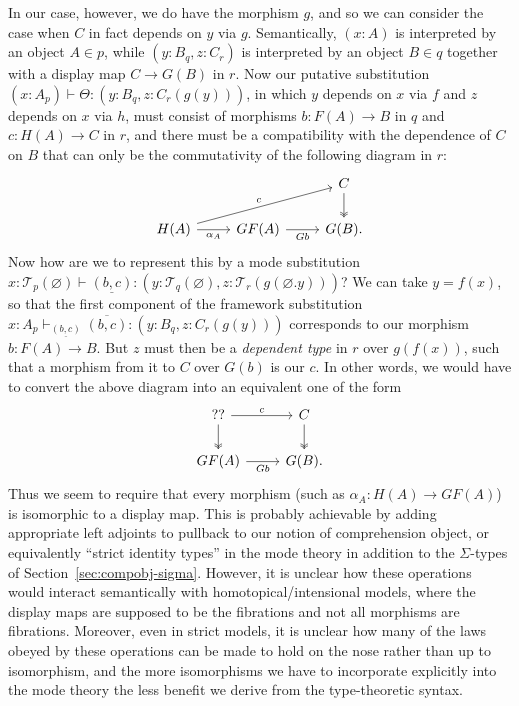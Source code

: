 \documentclass[10pt]{article}
\theoremstyle{definition}
\let\emptyset\varnothing
\newcommand{\yields}{\vdash}
\newcommand\El[2]{\mathcal{T}_{#1}(#2)}
\newcommand{\upstairs}[1]{\overline{#1}}
\newcommand{\downstairs}[1]{\underline{#1}}
\begin{document}
In our case, however, we do have the morphism $g$, and so we can consider the case when $C$ in fact depends on $y$ via $g$.
Semantically, $(x:A)$ is interpreted by an object $A\in p$, while $(y:B_q,z:C_r)$ is interpreted by an object $B\in q$ together with a display map $C \to G(B)$ in $r$.
Now our putative substitution $(x:A_p) \yields \Theta : (y:B_q, z:C_r(g(y)))$, in which $y$ depends on $x$ via $f$ and $z$ depends on $x$ via $h$, must consist of morphisms $b:F(A) \to B$ in $q$ and $c:H(A) \to C$ in $r$, and there must be a compatibility with the dependence of $C$ on $B$ that can only be the commutativity of the following diagram in $r$:
\[
  \begin{tikzcd}
    && C \ar[d,two heads] \\
    H(A) \ar[urr,"c"] \ar[r,"\alpha_A"'] & GF(A) \ar[r,"Gb"'] & G(B).
  \end{tikzcd}
\]
Now how are we to represent this by a mode substitution $x:\El{p}{\emptyset} \yields \downstairs{(b,c)} : (y:\El{q}{\emptyset},z:\El{r}{g(\emptyset.y)})$?
We can take $y = f(x)$, so that the first component of the framework substitution $x:A_p \yields_{\downstairs{(b,c)}} \upstairs{(b,c)} : (y:B_q, z:C_r(g(y)))$ corresponds to our morphism $b:F(A) \to B$.
But $z$ must then be a \emph{dependent type} in $r$ over $g(f(x))$, such that a morphism from it to $C$ over $G(b)$ is our $c$.
In other words, we would have to convert the above diagram into an equivalent one of the form
\[
  \begin{tikzcd}
    ?? \ar[r,"c"] \ar[d,two heads] & C \ar[d,two heads] \\
    GF(A) \ar[r,"Gb"'] & G(B).
  \end{tikzcd}
\]
Thus we seem to require that every morphism (such as $\alpha_A : H(A) \to GF(A)$) is isomorphic to a display map.
This is probably achievable by adding appropriate left adjoints to pullback to our notion of comprehension object, or equivalently ``strict identity types'' in the mode theory in addition to the $\Sigma$-types of Section~\ref{sec:compobj-sigma}.
However, it is unclear how these operations would interact semantically with homotopical/intensional models, where the display maps are supposed to be the fibrations and not all morphisms are fibrations.
Moreover, even in strict models, it is unclear how many of the laws obeyed by these operations can be made to hold on the nose rather than up to isomorphism, and the more isomorphisms we have to incorporate explicitly into the mode theory the less benefit we derive from the type-theoretic syntax.
\end{document}

